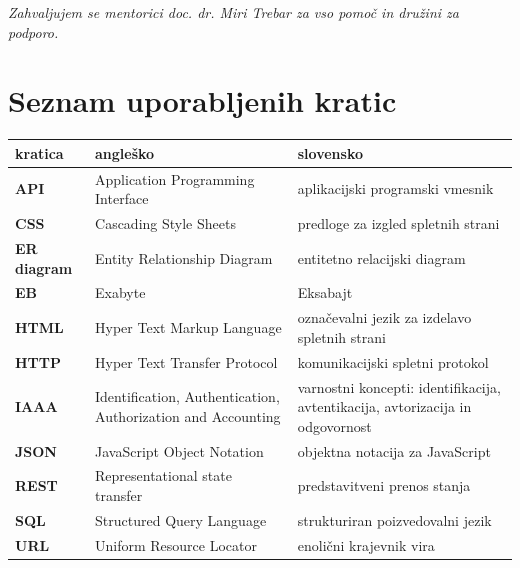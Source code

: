 \documentclass[a4paper, 12pt]{book}
\newcommand{\clearemptydoublepage}{\newpage{\pagestyle{empty}\cleardoublepage}}
\begin{document}
\vspace{2cm}

\clearemptydoublepage

\thispagestyle{empty}\mbox{}\vfill\null\it%
\noindent
Zahvaljujem se mentorici doc. dr. Miri Trebar za vso pomoč in družini za podporo.
\rm\normalfont

\clearemptydoublepage




\pagestyle{empty}
\def\thepage{}%
\tableofcontents{}


\clearemptydoublepage


\chapter*{Seznam uporabljenih kratic}  %

\noindent \begin{tabular}{p{}|p{}|p{}}    %
  {\bf kratica} & {\bf angleško}                             & {\bf slovensko} \\ \hline
  {\bf API} & Application Programming Interface & aplikacijski programski vmesnik \\
  {\bf CSS} & Cascading Style Sheets & predloge za izgled spletnih strani \\
  {\bf ER diagram} & Entity Relationship Diagram & entitetno relacijski diagram \\
  {\bf EB} & Exabyte & Eksabajt \\
  {\bf HTML} & Hyper Text Markup Language & označevalni jezik za izdelavo spletnih strani \\
  {\bf HTTP} & Hyper Text Transfer Protocol & komunikacijski spletni protokol \\
  {\bf IAAA} & Identification, Authentication, Authorization and Accounting & varnostni koncepti: identifikacija, avtentikacija, avtorizacija in odgovornost \\
  {\bf JSON} & JavaScript Object Notation & objektna notacija za JavaScript \\
  {\bf REST} & Representational state transfer & predstavitveni prenos stanja \\
  {\bf SQL} & Structured Query Language & strukturiran poizvedovalni jezik \\
  {\bf URL} & Uniform Resource Locator & enolični krajevnik vira \\
\end{tabular}
\end{document}
